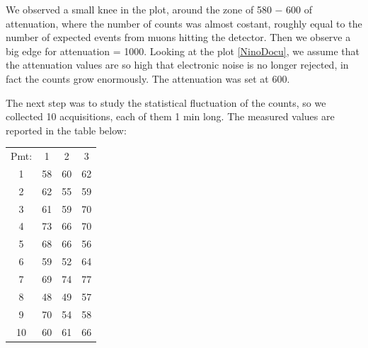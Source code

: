 \begin{figure}[hbtp]
\centering
{}
\end{figure}

We observed a small knee in the plot, around the zone of 580 − 600 of attenuation, where the number of counts was almost costant, roughly equal to the number of expected events from muons hitting the detector. Then we observe a big edge for attenuation = 1000. Looking at the plot \ref{NinoDocu}, we assume that the attenuation values are so high that electronic noise is no longer rejected, in fact the counts grow enormously. The attenuation was set at 600.

The next step was to study the statistical fluctuation of the counts, so we collected 10 acquisitions, each of them 1 min long. The measured values are reported in the table below:

\begin{center}
\begin{tabular}{|c|c|c|c|}
\hline 
Pmt: & 1 & 2 & 3 \\ 

1 & 58 & 60 & 62 \\ 
\hline 
2 & 62 & 55 & 59 \\ 
\hline 
3 & 61 & 59 & 70 \\ 
\hline 
4 & 73 & 66 & 70 \\ 
\hline 
5 & 68 & 66 & 56 \\ 
\hline 
6 & 59 & 52 & 64 \\ 
\hline 
7 & 69 & 74 & 77 \\ 
\hline 
8 & 48 & 49 & 57  \\ 
\hline 
9 & 70 & 54 & 58 \\ 
\hline 
10 & 60 & 61 & 66\\
\hline
\end{tabular} 
\end{center}

